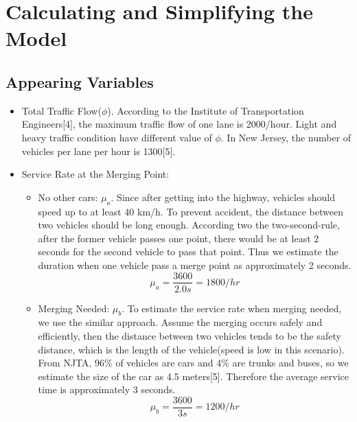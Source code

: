 \section{Calculating and Simplifying the Model}
\subsection{Appearing Variables}
\begin{itemize}
\item Total Traffic Flow($\phi$). According to the Institute of Transportation Engineers[4], the maximum traffic flow of one lane is 2000/hour. Light and heavy traffic condition have different value of $\phi$. In New Jersey, the number of vehicles per lane per hour is 1300[5].
\item Service Rate at the Merging Point:
\begin{itemize}
\item No other cars: $\mu_{a}$. Since after getting into the highway, vehicles should speed up to at least 40 km/h. To prevent accident, the distance between two vehicles should be long enough. According two the two-second-rule, after the former vehicle passes one point, there would be at least 2 seconds for the second vehicle to pass that point. Thus we estimate the duration when one vehicle pass a merge point as approximately 2 seconds.\\
\[
\mu_{a} = \frac{3600}{2.0 s} = 1800/hr
\]
\item Merging Needed: $\mu_{b}$. To estimate the service rate when merging needed, we use the similar approach. Assume the merging occurs safely and efficiently, then the distance between two vehicles tends to be the safety distance, which is the length of the vehicle(speed is low in this scenario). From NJTA, 96\% of vehicles are cars and 4\% are trunks and buses, so we estimate the size of the car as 4.5 meters[5]. Therefore the average service time is approximately 3 seconds.\\
\[
\mu_{b} = \frac{3600}{3 s} = 1200/hr
\]
\end{itemize}
\end{itemize}

